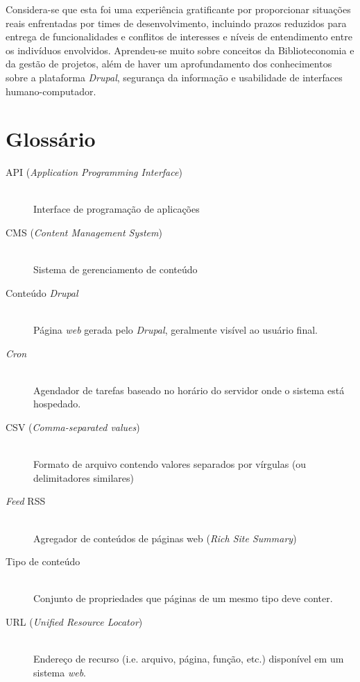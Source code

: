 \documentclass[a4paper]{article}
\begin{document}
Considera-se que esta foi uma experiência gratificante por proporcionar situações reais enfrentadas por times de desenvolvimento, incluindo prazos reduzidos para entrega de funcionalidades e conflitos de interesses e níveis de entendimento entre os indivíduos envolvidos. Aprendeu-se muito sobre conceitos da Biblioteconomia e da gestão de projetos, além de haver um aprofundamento dos conhecimentos sobre a plataforma \textit{Drupal}, segurança da informação e usabilidade de interfaces humano-computador.

\pagebreak
\section{Glossário}
\begin{description}
\item[API (\textit{Application Programming Interface})] \hfill \\ Interface de programação de aplicações
\item[CMS (\textit{Content Management System})] \hfill \\ Sistema de gerenciamento de conteúdo
\item[Conteúdo \textit{Drupal}] \hfill \\ Página \textit{web} gerada pelo \textit{Drupal}, geralmente visível ao usuário final.
\item[\textit{Cron}] \hfill \\ Agendador de tarefas baseado no horário do servidor onde o sistema está hospedado.
\item[CSV (\textit{Comma-separated values})] \hfill \\ Formato de arquivo contendo valores separados por vírgulas (ou delimitadores similares)
\item[\textit{Feed} RSS] \hfill \\ Agregador de conteúdos de páginas web (\textit{Rich Site Summary})
\item[Tipo de conteúdo] \hfill \\ Conjunto de propriedades que páginas de um mesmo tipo deve conter.
\item[URL (\textit{Unified Resource Locator})] \hfill \\ Endereço de recurso (i.e. arquivo, página, função, etc.) disponível em um sistema \textit{web}.
\end{description}
\end{document}
